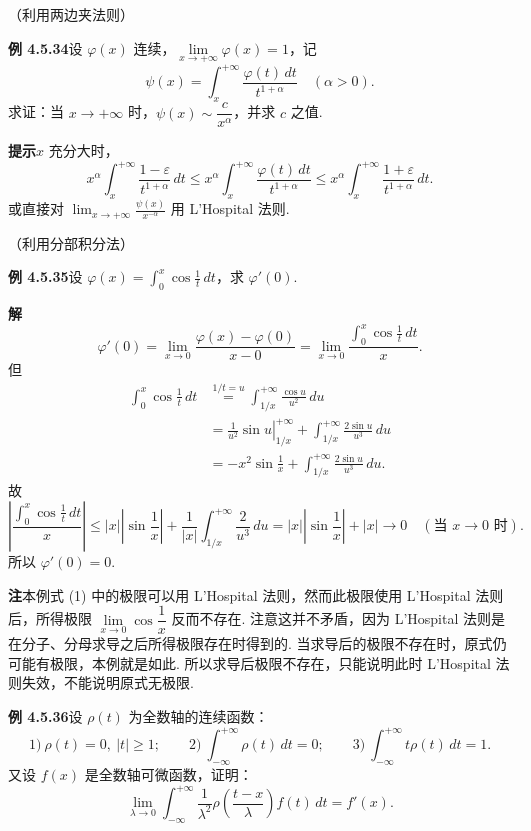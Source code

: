 \documentclass[UTF8, 12pt, fontset=fandol, oneside]{ctexart}
\begin{document}
（利用两边夹法则）

\noindent\textbf{例 4.5.34}\quad 设 $\varphi(x)$ 连续，$\lim\limits_{x\to+\infty}\varphi(x)=1$，记
\[
\psi(x)=\int_x^{+\infty}\frac{\varphi(t)\,dt}{t^{1+\alpha}}\quad(\alpha>0).
\]
求证：当 $x\to+\infty$ 时，$\psi(x)\sim\dfrac{c}{x^\alpha}$，并求 $c$ 之值.

\noindent\textbf{提示}\quad $x$ 充分大时，
\[
x^\alpha\int_x^{+\infty}\frac{1-\varepsilon}{t^{1+\alpha}}\,dt
\le x^\alpha\int_x^{+\infty}\frac{\varphi(t)\,dt}{t^{1+\alpha}}
\le x^\alpha\int_x^{+\infty}\frac{1+\varepsilon}{t^{1+\alpha}}\,dt.
\]
或直接对 $\displaystyle\lim_{x\to+\infty}\frac{\psi(x)}{x^{-\alpha}}$ 用 L'Hospital 法则.

（利用分部积分法）

\noindent\textbf{例 4.5.35}\quad 设 $\varphi(x)=\displaystyle\int_0^x\cos\frac1t\,dt$，求 $\varphi'(0)$.

\noindent\textbf{解}\quad
\begin{equation}
\varphi'(0)=\lim_{x\to0}\frac{\varphi(x)-\varphi(0)}{x-0}
=\lim_{x\to0}\frac{\displaystyle\int_0^x\cos\frac1t\,dt}{x}. \tag{1}
\end{equation}
但
\[
\begin{aligned}
\int_0^x\cos\frac1t\,dt
&\stackrel{1/t=u}{=}\int_{1/x}^{+\infty}\frac{\cos u}{u^2}\,du\\
&=\left.\frac1{u^2}\sin u\right|_{1/x}^{+\infty}
+\int_{1/x}^{+\infty}\frac{2\sin u}{u^3}\,du\\
&=-x^2\sin\frac1x+\int_{1/x}^{+\infty}\frac{2\sin u}{u^3}\,du.
\end{aligned}
\]
故
\[
\left|\frac{\displaystyle\int_0^x\cos\frac1t\,dt}{x}\right|
\le |x|\left|\sin\frac1x\right|+\frac1{|x|}\int_{1/x}^{+\infty}\frac2{u^3}\,du
=|x|\left|\sin\frac1x\right|+|x|\to0\quad(\text{当 }x\to0\text{ 时}).
\]
所以 $\varphi'(0)=0$.

\noindent\textbf{注}\quad 本例式 (1) 中的极限可以用 L'Hospital 法则，然而此极限使用 L'Hospital 法则后，所得极限
$\lim\limits_{x\to0}\cos\dfrac1x$ 反而不存在. 注意这并不矛盾，因为 L'Hospital 法则是在分子、分母求导之后所得极限存在时得到的.
当求导后的极限不存在时，原式仍可能有极限，本例就是如此. 所以求导后极限不存在，只能说明此时 L'Hospital 法则失效，不能说明原式无极限.

\noindent\textbf{例 4.5.36}\quad 设 $\rho(t)$ 为全数轴的连续函数：
\[
1)\ \rho(t)=0,\ |t|\ge1;\qquad
2)\ \int_{-\infty}^{+\infty}\rho(t)\,dt=0;\qquad
3)\ \int_{-\infty}^{+\infty}t\rho(t)\,dt=1.
\]
又设 $f(x)$ 是全数轴可微函数，证明：
\[
\lim_{\lambda\to0}\int_{-\infty}^{+\infty}\frac1{\lambda^2}\rho\left(\frac{t-x}{\lambda}\right)f(t)\,dt=f'(x).
\]
\end{document}
